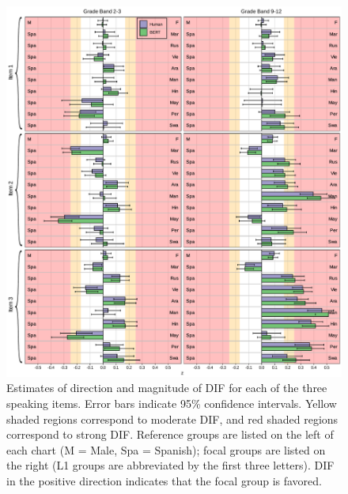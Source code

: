 \documentclass [PhD] {uclathes}
\begin{document}
\begin{figure}[t]
    \centering
    \includegraphics[width=16cm]{figures/20230504_ETS-DIF_BERT_z_itm_edit.pdf}
    \caption{Estimates of direction and magnitude of DIF for each of the three speaking items. Error bars indicate 95\% confidence intervals. Yellow shaded regions correspond to moderate DIF, and red shaded regions correspond to strong DIF. Reference groups are listed on the left of each chart (M = Male, Spa = Spanish); focal groups are listed on the right (L1 groups are abbreviated by the first three letters). DIF in the positive direction indicates that the focal group is favored.}
    \label{fig:z_itm}
\end{figure}


%
%
%

\end{document}
